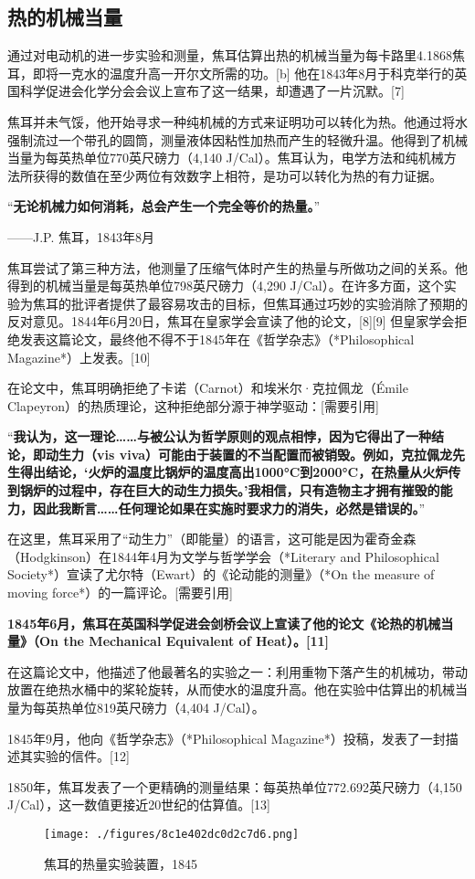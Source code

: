 \subsection{热的机械当量}  
通过对电动机的进一步实验和测量，焦耳估算出热的机械当量为每卡路里4.1868焦耳，即将一克水的温度升高一开尔文所需的功。[b] 他在1843年8月于科克举行的英国科学促进会化学分会会议上宣布了这一结果，却遭遇了一片沉默。[7]  

焦耳并未气馁，他开始寻求一种纯机械的方式来证明功可以转化为热。他通过将水强制流过一个带孔的圆筒，测量液体因粘性加热而产生的轻微升温。他得到了机械当量为每英热单位770英尺磅力（4,140 J/Cal）。焦耳认为，电学方法和纯机械方法所获得的数值在至少两位有效数字上相符，是功可以转化为热的有力证据。  

“\textbf{无论机械力如何消耗，总会产生一个完全等价的热量。}”

——J.P. 焦耳，1843年8月  

焦耳尝试了第三种方法，他测量了压缩气体时产生的热量与所做功之间的关系。他得到的机械当量是每英热单位798英尺磅力（4,290 J/Cal）。在许多方面，这个实验为焦耳的批评者提供了最容易攻击的目标，但焦耳通过巧妙的实验消除了预期的反对意见。1844年6月20日，焦耳在皇家学会宣读了他的论文，[8][9] 但皇家学会拒绝发表这篇论文，最终他不得不于1845年在《哲学杂志》（*Philosophical Magazine*）上发表。[10]  

在论文中，焦耳明确拒绝了卡诺（Carnot）和埃米尔·克拉佩龙（Émile Clapeyron）的热质理论，这种拒绝部分源于神学驱动：[需要引用]  

“\textbf{我认为，这一理论……与被公认为哲学原则的观点相悖，因为它得出了一种结论，即动生力（vis viva）可能由于装置的不当配置而被销毁。例如，克拉佩龙先生得出结论，‘火炉的温度比锅炉的温度高出1000°C到2000°C，在热量从火炉传到锅炉的过程中，存在巨大的动生力损失。’我相信，只有造物主才拥有摧毁的能力，因此我断言……任何理论如果在实施时要求力的消失，必然是错误的。}”

在这里，焦耳采用了“动生力”（即能量）的语言，这可能是因为霍奇金森（Hodgkinson）在1844年4月为文学与哲学学会（*Literary and Philosophical Society*）宣读了尤尔特（Ewart）的《论动能的测量》（*On the measure of moving force*）的一篇评论。[需要引用]  

\textbf{1845年6月，焦耳在英国科学促进会剑桥会议上宣读了他的论文《论热的机械当量》（On the Mechanical Equivalent of Heat）。[11] }

在这篇论文中，他描述了他最著名的实验之一：利用重物下落产生的机械功，带动放置在绝热水桶中的桨轮旋转，从而使水的温度升高。他在实验中估算出的机械当量为每英热单位819英尺磅力（4,404 J/Cal）。  

1845年9月，他向《哲学杂志》（*Philosophical Magazine*）投稿，发表了一封描述其实验的信件。[12]  

1850年，焦耳发表了一个更精确的测量结果：每英热单位772.692英尺磅力（4,150 J/Cal），这一数值更接近20世纪的估算值。[13]
\begin{figure}[ht]
\centering
\texttt{[image: ./figures/8c1e402dc0d2c7d6.png]}
\caption{焦耳的热量实验装置，1845} \label{fig_JR_1}
\end{figure}
